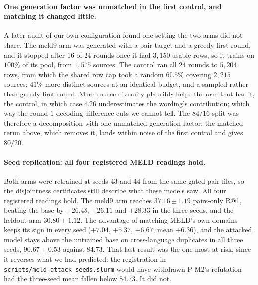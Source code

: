 \paragraph{One generation factor was unmatched in the first control, and matching it changed little.}
A later audit of our own configuration found one setting the two arms did not share. The meld9 arm was generated with a pair target and a greedy first round, and it stopped after $16$ of $24$ rounds once it had $3{,}150$ usable rows, so it trains on $100\%$ of its pool, from $1{,}575$ sources. The control ran all $24$ rounds to $5{,}204$ rows, from which the shared row cap took a random $60.5\%$ covering $2{,}215$ sources: $41\%$ more distinct sources at an identical budget, and a sampled rather than greedy first round. More source diversity plausibly helps the arm that has it, the control, in which case $4.26$ underestimates the wording's contribution; which way the round-$1$ decoding difference cuts we cannot tell. The $84/16$ split was therefore a decomposition with one unmatched generation factor; the matched rerun above, which removes it, lands within noise of the first control and gives $80/20$.

\paragraph{Seed replication: all four registered MELD readings hold.}
Both arms were retrained at seeds $43$ and $44$ from the same gated pair files, so the disjointness certificates still describe what these models saw. All four registered readings hold. The meld9 arm reaches $37.16 \pm 1.19$ pairs-only R@1, beating the base by $+26.48$, $+26.11$ and $+28.33$ in the three seeds, and the heldout arm $30.80 \pm 1.12$. The advantage of matching MELD's own domains keeps its sign in every seed ($+7.04$, $+5.37$, $+6.67$; mean $+6.36$), and the attacked model stays above the untrained base on cross-language duplicates in all three seeds, $90.67 \pm 0.53$ against $84.73$. That last result was the one most at risk, since it reverses what we had predicted: the registration in \texttt{scripts/meld\_attack\_seeds.slurm} would have withdrawn P-M2's refutation had the three-seed mean fallen below $84.73$. It did not.


